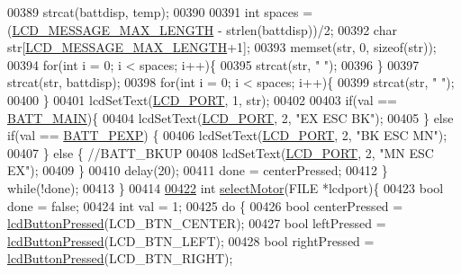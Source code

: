\begin{DoxyCode}
{{00389         strcat(battdisp, temp);
00390 
00391         \textcolor{keywordtype}{int} spaces = (\hyperlink{lcdmsg_8h_abe4c4b70fc6f44ae3680e5b2c68cdd00}{LCD\_MESSAGE\_MAX\_LENGTH} - strlen(battdisp))/2;
00392         \textcolor{keywordtype}{char} str[\hyperlink{lcdmsg_8h_abe4c4b70fc6f44ae3680e5b2c68cdd00}{LCD\_MESSAGE\_MAX\_LENGTH}+1];
00393         memset(str, 0, \textcolor{keyword}{sizeof}(str));
00394         \textcolor{keywordflow}{for}(\textcolor{keywordtype}{int} i = 0; i < spaces; i++)\{
00395             strcat(str, \textcolor{stringliteral}{" "});
00396         \}
00397         strcat(str, battdisp);
00398         \textcolor{keywordflow}{for}(\textcolor{keywordtype}{int} i = 0; i < spaces; i++)\{
00399             strcat(str, \textcolor{stringliteral}{" "});
00400         \}
00401         lcdSetText(\hyperlink{lcdmsg_8h_abcf42bd88b3c36193f301ca25b033875}{LCD\_PORT}, 1, str);
00402 
00403         \textcolor{keywordflow}{if}(val == \hyperlink{sensors_8h_aa48831e4de90908c1b37560e7aba2c5f}{BATT\_MAIN})\{
00404             lcdSetText(\hyperlink{lcdmsg_8h_abcf42bd88b3c36193f301ca25b033875}{LCD\_PORT}, 2, \textcolor{stringliteral}{"EX     ESC    BK"});
00405         \} \textcolor{keywordflow}{else} \textcolor{keywordflow}{if}(val == \hyperlink{sensors_8h_aaad063d8cfbd393cdc04bcaae68b48ef}{BATT\_PEXP}) \{
00406             lcdSetText(\hyperlink{lcdmsg_8h_abcf42bd88b3c36193f301ca25b033875}{LCD\_PORT}, 2, \textcolor{stringliteral}{"BK     ESC    MN"});
00407         \} \textcolor{keywordflow}{else} \{ \textcolor{comment}{//BATT\_BKUP}
00408             lcdSetText(\hyperlink{lcdmsg_8h_abcf42bd88b3c36193f301ca25b033875}{LCD\_PORT}, 2, \textcolor{stringliteral}{"MN     ESC    EX"});
00409         \}
00410         delay(20);
00411         done = centerPressed;
00412     \} \textcolor{keywordflow}{while}(!done);
00413 \}
00414 
\hypertarget{lcddiag_8c_source.tex_l00422}{}\hyperlink{lcddiag_8c_ae7425e4ec1454bd0054bd4e1db7ea686}{00422} \textcolor{keywordtype}{int} \hyperlink{lcddiag_8c_ae7425e4ec1454bd0054bd4e1db7ea686}{selectMotor}(FILE *lcdport)\{
00423     \textcolor{keywordtype}{bool} done = \textcolor{keyword}{false};
00424     \textcolor{keywordtype}{int} val = 1;
00425     \textcolor{keywordflow}{do} \{
00426         \textcolor{keywordtype}{bool} centerPressed = \hyperlink{lcddiag_8h_a74e4c744db49f9b7b645095575e152ad}{lcdButtonPressed}(LCD\_BTN\_CENTER);
00427         \textcolor{keywordtype}{bool} leftPressed = \hyperlink{lcddiag_8h_a74e4c744db49f9b7b645095575e152ad}{lcdButtonPressed}(LCD\_BTN\_LEFT);
00428         \textcolor{keywordtype}{bool} rightPressed = \hyperlink{lcddiag_8h_a74e4c744db49f9b7b645095575e152ad}{lcdButtonPressed}(LCD\_BTN\_RIGHT);
}}
\end{DoxyCode}

